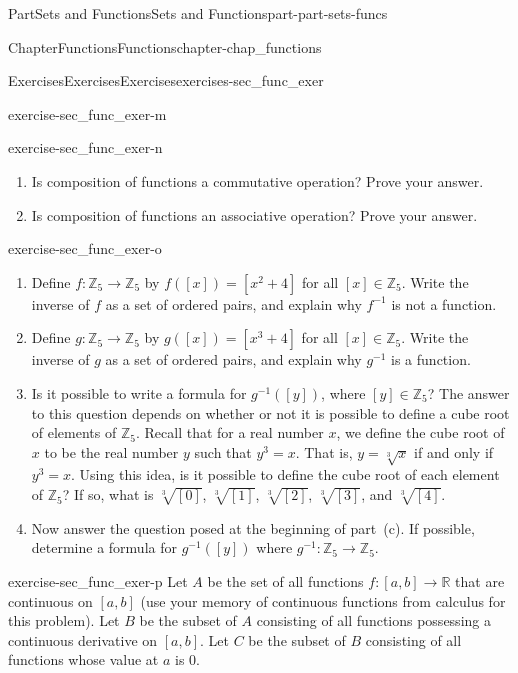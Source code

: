 \documentclass[oneside,10pt,]{book}
\numberwithin{equation}{chapter}
\newcommand{\Z}{\mathbb{Z}}
\newcommand{\R}{\mathbb{R}}
\begin{document}
\begin{partptx}{Part}{Sets and Functions}{}{Sets and Functions}{}{}{part-part-sets-funcs}
\begin{chapterptx}{Chapter}{Functions}{}{Functions}{}{}{chapter-chap_functions}
\begin{exercises-section}{Exercises}{Exercises}{}{Exercises}{}{}{exercises-sec_func_exer}
\begin{divisionexercise}{13}{}{}{exercise-sec_func_exer-m}
\begin{enumerate}[font=\bfseries,label=(\alph*),ref=\alph*]
\end{enumerate}%
\end{divisionexercise}%
\begin{divisionexercise}{14}{}{}{exercise-sec_func_exer-n}%
\begin{enumerate}[font=\bfseries,label=(\alph*),ref=\alph*]%
\item{}Is composition of functions a commutative operation? Prove your answer.%
\item{}Is composition of functions an associative operation? Prove your answer.%
\end{enumerate}%
\end{divisionexercise}%
\begin{divisionexercise}{15}{}{}{exercise-sec_func_exer-o}%
\begin{enumerate}[font=\bfseries,label=(\alph*),ref=\alph*]%
\item{}Define \(f: \Z_5 \to \Z_5\) by \(f\left( [x] \right) = \left[x^2 + 4 \right]\) for all \([x] \in \Z_5\). Write the inverse of \(f\) as a set of ordered pairs, and explain why \(f^{-1}\) is not a function.%
\item{}Define \(g: \Z_5 \to \Z_5\) by \(g\left( [x] \right) = \left[x^3 + 4 \right]\) for all \([x] \in \Z_5\). Write the inverse of \(g\) as a set of ordered pairs, and explain why \(g^{-1}\) is a function.%
\item{}Is it possible to write a formula for \(g^{-1}\left( [y] \right)\), where \([y] \in \Z_5\)? The answer to this question depends on whether or not it is possible to define a cube root of elements of \(\Z_5\). Recall that for a real number \(x\), we define the cube root of \(x\) to be the real number \(y\) such that \(y^3 = x\). That is, \(y = \sqrt[3]{x}\) if and only if \(y^3 = x\). Using this idea, is it possible to define the cube root of each element of \(\Z_5\)? If so, what is \(\sqrt[3]{[0]}\), \(\sqrt[3]{[1]}\), \(\sqrt[3]{[2]}\), \(\sqrt[3]{[3]}\), and \(\sqrt[3]{[4]}\).%
\item{}Now answer the question posed at the beginning of part~(c). If possible, determine a formula for \(g^{-1}\left([y] \right)\) where \(g^{-1}: \Z_5 \to \Z_5\).%
\end{enumerate}%
\end{divisionexercise}%
\begin{divisionexercise}{16}{}{}{exercise-sec_func_exer-p}%
Let \(A\) be the set of all functions \(f:[a,b] \to \R\) that are continuous on \([a,b]\) (use your memory of continuous functions from calculus for this problem). Let \(B\) be the subset of \(A\) consisting of all functions possessing a continuous derivative on \([a,b]\). Let \(C\) be the subset of \(B\) consisting of all functions whose value at \(a\) is 0.%

\end{divisionexercise}
\end{exercises-section}
\end{chapterptx}
\end{partptx}
\end{document}
